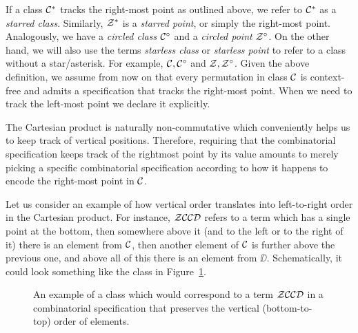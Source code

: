 \documentclass[12pt, a4paper, twoside]{report}
\begin{document}
 If a class $\mathcal{C}^*$ tracks the right-most point as outlined above, we refer to $\mathcal{C}^*$ as a \emph{starred class}. Similarly, $\mathcal{Z}^*$ is a \emph{starred point}, or simply the right-most point. Analogously, we have a \emph{circled class} $\mathcal{C}^\circ$ and a \emph{circled point} $\mathcal{Z}^\circ$. On the other hand, we will also use the terms \emph{starless class} or \emph{starless point} to refer to a class without a star/asterisk. For example, $\mathcal{C}, \mathcal{C}^\circ$ and $\mathcal{Z}, \mathcal{Z}^\circ$. Given the above definition, we assume from now on that every permutation in class $\mathcal{C}$ is context-free and admits a specification that tracks the right-most point. When we need to track the left-most point we declare it explicitly.

   
The Cartesian product is naturally non-commutative which conveniently helps us to keep track of vertical positions. Therefore, requiring that the combinatorial specification keeps track of the rightmost point by its value amounts to merely picking a specific combinatorial specification according to how it happens to encode the right-most point in $\mathcal{C}$. 

Let us consider an example of how vertical order translates into left-to-right order in the Cartesian product. For instance, $\mathcal{Z}\mathcal{C}\mathcal{C}\mathcal{D}$ refers to a term which has a single point at the bottom, then somewhere above it (and to the left or to the right of it) there is an element from $\mathcal{C}$, then another element of $\mathcal{C}$ is further above the previous one, and above all of this there is an element from $\DD$. Schematically, it could look something like the class in Figure~\ref{fig:order}.

\begin{figure}[ht]
  \centering
  \caption{An example of a class which would correspond to a term $\mathcal{Z}\mathcal{C}\mathcal{C}\mathcal{D}$ in a combinatorial specification that preserves the vertical (bottom-to-top) order of elements.}
  \label{fig:order}
\end{figure}
\end{document}
